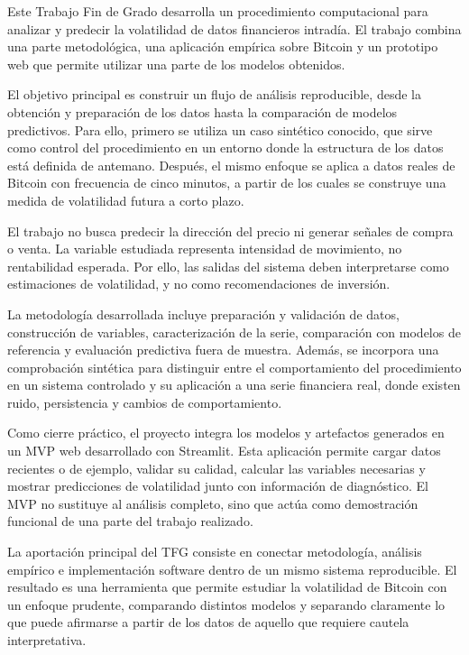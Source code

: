
\begingroup

Este Trabajo Fin de Grado desarrolla un procedimiento computacional para analizar y predecir la volatilidad de datos financieros intradía. El trabajo combina una parte metodológica, una aplicación empírica sobre Bitcoin y un prototipo web que permite utilizar una parte de los modelos obtenidos.

El objetivo principal es construir un flujo de análisis reproducible, desde la obtención y preparación de los datos hasta la comparación de modelos predictivos. Para ello, primero se utiliza un caso sintético conocido, que sirve como control del procedimiento en un entorno donde la estructura de los datos está definida de antemano. Después, el mismo enfoque se aplica a datos reales de Bitcoin con frecuencia de cinco minutos, a partir de los cuales se construye una medida de volatilidad futura a corto plazo.

El trabajo no busca predecir la dirección del precio ni generar señales de compra o venta. La variable estudiada representa intensidad de movimiento, no rentabilidad esperada. Por ello, las salidas del sistema deben interpretarse como estimaciones de volatilidad, y no como recomendaciones de inversión.

La metodología desarrollada incluye preparación y validación de datos, construcción de variables, caracterización de la serie, comparación con modelos de referencia y evaluación predictiva fuera de muestra. Además, se incorpora una comprobación sintética para distinguir entre el comportamiento del procedimiento en un sistema controlado y su aplicación a una serie financiera real, donde existen ruido, persistencia y cambios de comportamiento.

Como cierre práctico, el proyecto integra los modelos y artefactos generados en un MVP web desarrollado con Streamlit. Esta aplicación permite cargar datos recientes o de ejemplo, validar su calidad, calcular las variables necesarias y mostrar predicciones de volatilidad junto con información de diagnóstico. El MVP no sustituye al análisis completo, sino que actúa como demostración funcional de una parte del trabajo realizado.

La aportación principal del TFG consiste en conectar metodología, análisis empírico e implementación software dentro de un mismo sistema reproducible. El resultado es una herramienta que permite estudiar la volatilidad de Bitcoin con un enfoque prudente, comparando distintos modelos y separando claramente lo que puede afirmarse a partir de los datos de aquello que requiere cautela interpretativa.

\endgroup